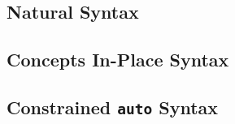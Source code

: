 \subsection{Natural Syntax} \label{sec:natural_syntax}

\subsection{Concepts In-Place Syntax} \label{sec:concepts_in-place_syntax}

\subsection{Constrained \texttt{auto} Syntax} \label{sec:constrained_auto_syntax}
